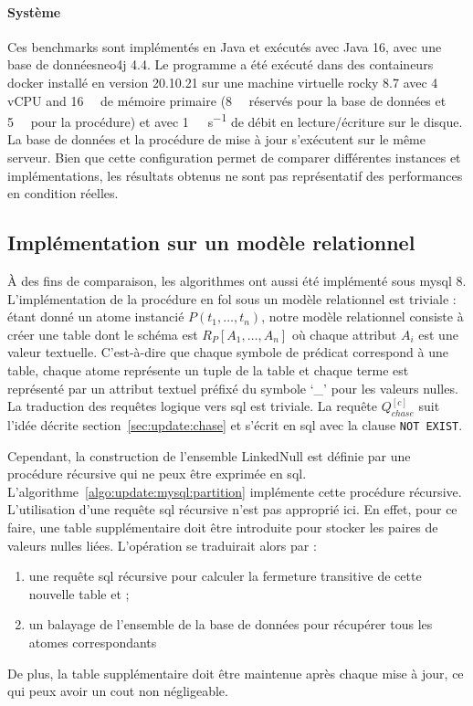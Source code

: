 \paragraph{Système}
Ces benchmarks sont implémentés en Java et exécutés avec {Java 16}, avec une base de données\gls{neo4j} 4.4.
Le programme a été exécuté dans des containeurs \gls{docker} installé en version 20.10.21 sur une machine virtuelle \gls{rocky} 8.7 avec \num{4} vCPU and \SI{16}{\giga\byte} de mémoire primaire (\SI{8}{\giga\byte} réservés pour la base de données et \SI{5}{\giga\byte} pour la procédure) et avec \SI{1}{\giga\byte\per\second} de débit en lecture/écriture sur le disque.
La base de données et la procédure de mise à jour s'exécutent sur le même serveur.
Bien que cette configuration permet de comparer différentes instances et implémentations, les résultats obtenus ne sont pas représentatif des performances en condition réelles.

\subsection{Implémentation sur un modèle relationnel}
\label{sec:update:evaluation:mysql}
À des fins de comparaison, les algorithmes ont aussi été implémenté sous \gls{mysql} 8.
L'implémentation de la procédure en \gls{fol} sous un modèle relationnel est triviale : étant donné un atome instancié $P(t_1, \dots, t_n)$, notre modèle relationnel consiste à créer une table dont le schéma est $R_P[A_1, \dots, A_n]$ où chaque attribut $A_i$ est une valeur textuelle.
C'est-à-dire que chaque symbole de prédicat correspond à une table, chaque atome représente un tuple de la table et chaque terme est représenté par un attribut textuel préfixé du symbole `\_' pour les valeurs nulles.
La traduction des requêtes logique vers \gls{sql} est triviale.
La requête $Q_{chase}^{[c]}$ suit l'idée décrite section~\ref{sec:update:chase} et s'écrit en \gls{sql} avec la clause \verb|NOT EXIST|.

Cependant, la construction de l'ensemble \textsf{LinkedNull} est définie par une procédure récursive qui ne peux être exprimée en \gls{sql}.
L'algorithme~\ref{algo:update:mysql:partition} implémente cette procédure récursive.
L'utilisation d'une requête \gls{sql} récursive n'est pas approprié ici.
En effet, pour ce faire, une table supplémentaire doit être introduite pour stocker les paires de valeurs nulles liées.
L'opération se traduirait alors par :
\begin{enumerate}
    \item une requête \gls{sql} récursive pour calculer la fermeture transitive de cette nouvelle table et ;
    \item un balayage de l'ensemble de la base de données pour récupérer tous les atomes correspondants
\end{enumerate}
De plus, la table supplémentaire doit être maintenue après chaque mise à jour, ce qui peux avoir un cout non négligeable.

